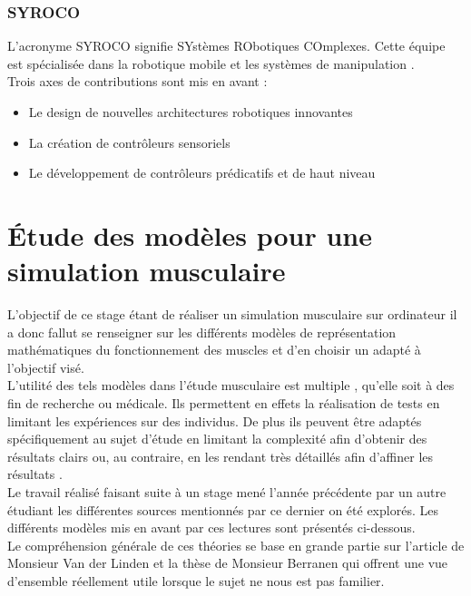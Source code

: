 \subsection*{SYROCO}
L'acronyme SYROCO signifie SYstèmes RObotiques COmplexes. Cette équipe est spécialisée dans la robotique mobile et les systèmes de manipulation \cite{noauthor_isir_nodate-7}.\\
Trois axes de contributions sont mis en avant : 
\begin{itemize}
    \item Le design de nouvelles architectures robotiques innovantes  
    \item La création de contrôleurs sensoriels 
    \item Le développement de contrôleurs prédicatifs et de haut niveau
\end{itemize}

\chapter{Étude des modèles pour une simulation musculaire}

L'objectif de ce stage étant de réaliser un simulation musculaire sur ordinateur il a donc fallut se renseigner sur les différents modèles de représentation mathématiques du fonctionnement des muscles et d'en choisir un adapté à l'objectif visé.\\

L'utilité des tels modèles dans l'étude musculaire est multiple , qu'elle soit à des fin de recherche ou médicale. Ils permettent en effets la réalisation de tests en limitant les expériences sur des individus. De plus ils peuvent être adaptés spécifiquement au sujet d'étude en limitant la complexité afin d'obtenir des résultats clairs ou, au contraire, en les rendant très détaillés afin d'affiner les résultats \cite{berranen_simulation_2015}.\\ 

Le travail réalisé faisant suite à un stage mené l'année précédente par un autre étudiant les différentes sources mentionnés par ce dernier on été explorés. Les différents modèles mis en avant par ces lectures sont présentés ci-dessous.\\
Le compréhension générale de ces théories se base en grande partie sur l'article de Monsieur Van der Linden \cite{linden_mechanical_1998} et la thèse de Monsieur Berranen \cite{berranen_simulation_2015} qui offrent une vue d'ensemble réellement utile lorsque le sujet ne nous est pas familier. 

